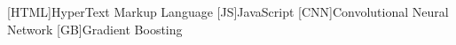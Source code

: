 [HTML]{HyperText Markup Language}
[JS]{JavaScript}
[CNN]{Convolutional Neural Network}
[GB]{Gradient Boosting}
